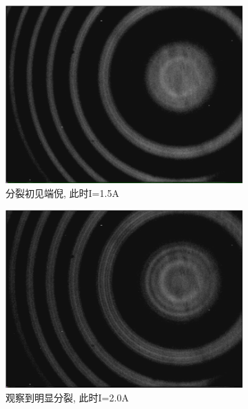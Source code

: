 \documentclass[12pt,a4paper]{article}
\begin{document}
\begin{figure}[H]
    \centering
    \begin{subfigure}[b]{0.3\textwidth}
      \centering
      \includegraphics[width=\textwidth]{1.5g.jpg}
      \caption{分裂初见端倪, 此时I=1.5A}
    \end{subfigure}
    \hfill
    \begin{subfigure}[b]{0.3\textwidth}
      \centering
      \includegraphics[width=\textwidth]{2.0g.jpg}
      \caption{观察到明显分裂, 此时I=2.0A}
    \end{subfigure}
    \hfill
    \begin{subfigure}[b]{0.3\textwidth}
      \centering

\end{subfigure}
\end{figure}
\end{document}

